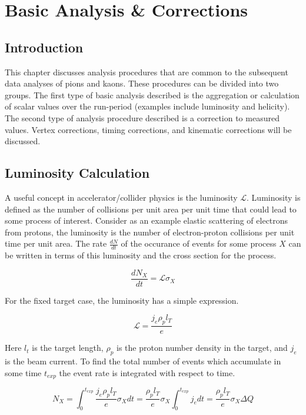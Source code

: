 \chapter{Basic Analysis \& Corrections}

\section{Introduction}
This chapter discusses analysis procedures that are common to the subsequent data analyses of pions and kaons.  These procedures can be divided into two groups.  The first type of basic analysis described is the aggregation or calculation of scalar values over the run-period (examples include luminosity and helicity).  The second type of analysis procedure described is a correction to measured values.  Vertex corrections, timing corrections, and kinematic corrections will be discussed.


\section{Luminosity Calculation}
A useful concept in accelerator/collider physics is the luminosity $\mathcal{L}$.  Luminosity is defined as the number of collisions per unit area per unit time that could lead to some process of interest.  Consider as an example elastic scattering of electrons from protons, the luminosity is the number of electron-proton collisions per unit time per unit area.  The rate $\frac{dN}{dt}$ of the occurance of events for some process $X$ can be written in terms of this luminosity and the cross section for the process.

\begin{equation}
	\frac{dN_X}{dt} = \mathcal{L} \sigma_X 
\end{equation}

For the fixed target case, the luminosity has a simple expression.

\begin{equation}
	\mathcal{L} = \frac{j_e \rho_p l_T}{e} 
\end{equation}

Here $l_t$ is the target length, $\rho_p$ is the proton number density in the target, and $j_e$ is the beam current. To find the total number of events which accumulate in some time $t_{exp}$ the event rate is integrated with respect to time.

\begin{equation}
	N_X = \int_{0}^{t_{exp}} \frac{j_e \rho_p l_T}{e} \sigma_X dt = \frac{\rho_p l_T}{e} \sigma_X \int_{0}^{t_{exp}} j_e dt =  \frac{\rho_p l_T}{e} \sigma_X \Delta Q
\end{equation}

